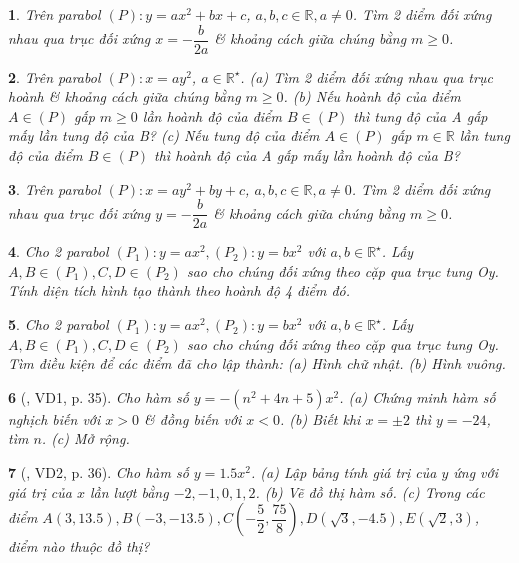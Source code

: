 \documentclass{article}
\newtheorem{baitoan}{}
\begin{document}
\begin{baitoan}
	Trên parabol $(P):y = ax^2 + bx + c$, $a,b,c\in\mathbb{R},a\ne0$. Tìm 2 diểm đối xứng nhau qua trục đối xứng $x = -\dfrac{b}{2a}$ \& khoảng cách giữa chúng bằng $m\ge0$.
\end{baitoan}

\begin{baitoan}
	Trên parabol $(P):x = ay^2$, $a\in\mathbb{R}^\star$. (a) Tìm 2 diểm đối xứng nhau qua trục hoành \& khoảng cách giữa chúng bằng $m\ge0$. (b) Nếu hoành độ của điểm $A\in(P)$ gấp $m\ge0$ lần hoành độ của điểm $B\in(P)$ thì tung độ của A gấp mấy lần tung độ của B? (c) Nếu tung độ của điểm $A\in(P)$ gấp $m\in\mathbb{R}$ lần tung độ của điểm $B\in(P)$ thì hoành độ của A gấp mấy lần hoành độ của B?
\end{baitoan}

\begin{baitoan}
	Trên parabol $(P):x = ay^2 + by + c$, $a,b,c\in\mathbb{R},a\ne0$. Tìm 2 diểm đối xứng nhau qua trục đối xứng $y = -\dfrac{b}{2a}$ \& khoảng cách giữa chúng bằng $m\ge0$.
\end{baitoan}

\begin{baitoan}
	Cho 2 parabol $(P_1):y = ax^2,(P_2):y = bx^2$ với $a,b\in\mathbb{R}^\star$. Lấy $A,B\in(P_1),C,D\in(P_2)$ sao cho chúng đối xứng theo cặp qua trục tung Oy. Tính diện tích hình tạo thành theo hoành độ 4 điểm đó.
\end{baitoan}

\begin{baitoan}
	Cho 2 parabol $(P_1):y = ax^2,(P_2):y = bx^2$ với $a,b\in\mathbb{R}^\star$. Lấy $A,B\in(P_1),C,D\in(P_2)$ sao cho chúng đối xứng theo cặp qua trục tung Oy. Tìm điều kiện để các điểm đã cho lập thành: (a) Hình chữ nhật. (b) Hình vuông.
\end{baitoan}

\begin{baitoan}[\cite{Binh_boi_duong_Toan_9_tap_2}, VD1, p. 35]
	Cho hàm số $y = -(n^2 + 4n + 5)x^2$. (a) Chứng minh hàm số nghịch biến với $x > 0$ \& đồng biến với $x < 0$. (b) Biết khi $x = \pm2$ thì $y = -24$, tìm $n$. (c) Mở rộng.
\end{baitoan}

\begin{baitoan}[\cite{Binh_boi_duong_Toan_9_tap_2}, VD2, p. 36]
	Cho hàm số $y = 1.5x^2$. (a) Lập bảng tính giá trị của $y$ ứng với giá trị của $x$ lần lượt bằng $-2,-1,0,1,2$. (b) Vẽ đồ thị hàm số. (c) Trong các điểm $A(3,13.5),B(-3,-13.5),C\left(-\dfrac{5}{2},\dfrac{75}{8}\right),D(\sqrt{3},-4.5),E(\sqrt{2},3)$, điểm nào thuộc đồ thị?
\end{baitoan}
\end{document}
